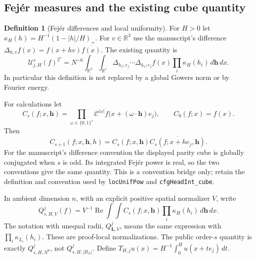 \documentclass[11pt]{article}
\theoremstyle{definition}
\newtheorem{definition}[definition]{Definition}
\newcommand{\pid}[1]{\nolinkurl{#1}}
\begin{document}
\subsection{Fej\'er measures and the existing cube quantity}
\begin{definition}[Fej\'er differences and local uniformity]\label{def:local-uniformity}
For $H>0$ let $\kappa_H(h)=H^{-1}(1-|h|/H)_+$.
For $v\in\mathbb R^3$ use the manuscript's difference
$\Delta_{h;v}f(x)=f(x+hv)\overline{f(x)}$.
The existing quantity is
\[
 \mathcal U^s_{j,H}(f)^{2^s}
 =N^{-6}\int_{\mathbb R^3}\int_{\mathbb R^s}
       \Delta_{h_1;e_j}\cdots\Delta_{h_s;e_j}f(x)
           \prod_i\kappa_H(h_i)\,d\mathbf h\,dx.
\]
In particular this definition is not replaced by a global Gowers norm or by Fourier energy.
\end{definition}
For calculations let
\[
 C_s(f;x,\mathbf h)=\prod_{\omega\in\{0,1\}^s}
       \mathcal C^{|\omega|}f\bigl(x+(\omega\cdot\mathbf h)e_j\bigr),
 \qquad C_0(f;x)=f(x).
\]
Then
\begin{equation}\label{patch:cube-succ}
 C_{s+1}(f;x,\mathbf h,h)=C_s(f;x,\mathbf h)
                                  \overline{C_s(f;x+he_j,\mathbf h)}.
\end{equation}
For the manuscript's difference convention the displayed parity cube is globally conjugated
when $s$ is odd.  Its integrated Fej\'er power is real, so the two conventions give the same
quantity.  This is a convention bridge only; retain the definition and convention used by
\pid{locUnifPow} and \pid{cfgHeadInt_cube}.

In ambient dimension $n$, with an explicit positive spatial normalizer $V$, write
\[
 Q_{s,H,V}^{j}(f)=V^{-1}\operatorname{Re}\int\!\int C_s(f;x,\mathbf h)
                                   \prod_i\kappa_H(h_i)\,d\mathbf h\,dx.
\]
The notation with unequal radii, $Q_{\mathbf L,V}^{j}$, means the same expression with
$\prod_i\kappa_{L_i}(h_i)$.  These are proof-local normalizations.  The public order-$s$
quantity is exactly $Q_{s,H,N^6}^{j}$, not $Q_{s,H,|B_N|}^{j}$.
Define $T_{H,j}u(x)=H^{-1}\int_0^H u(x+te_j)\,dt$.
\end{document}
